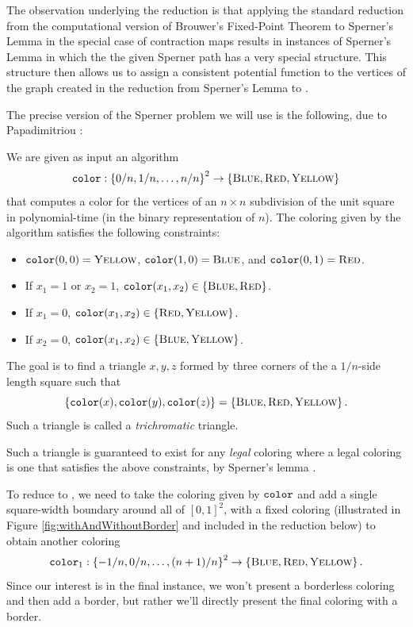 The observation underlying the reduction is that applying the standard reduction from the computational version of Brouwer's Fixed-Point Theorem to Sperner's Lemma in the special case of contraction maps results in instances of Sperner's Lemma in which the the given Sperner path has a very special structure. This structure then allows us to assign a consistent potential function to the vertices of the \PPAD graph created in the reduction from Sperner's Lemma to \EOL.

The precise version of the Sperner problem we will use is the following, due to Papadimitriou \cite{papadimitriou1994complexity}:
\begin{definition}[\Sperner] 
  \label{def:Sperner}
  We are given as input an algorithm
  \[\operatorname{\texttt{color}}: \left\{ 0/n,1/n,\dotsc,n/n \right\}^2 \to \left\{ \textsc{Blue}, \textsc{Red}, \textsc{Yellow} \right\}\] that computes a color for the vertices of an $n\times n$ subdivision of the unit square in polynomial-time (in the binary representation of $n$). The coloring given by the algorithm satisfies the following constraints:
  \begin{itemize}
  \item $\operatorname{\texttt{color}}(0, 0) = \textsc{Yellow}$, $\operatorname{\texttt{color}}(1, 0) = \textsc{Blue}$, and $\operatorname{\texttt{color}}(0, 1) = \textsc{Red}$.
  \item If $x_1 = 1$ or $x_2 = 1$, $\operatorname{\texttt{color}}(x_1,x_2) \in \left\{ \textsc{Blue}, \textsc{Red} \right\}$.
  \item If $x_1 = 0$, $\operatorname{\texttt{color}}(x_1,x_2) \in \left\{ \textsc{Red}, \textsc{Yellow} \right\}$.
  \item If $x_2 = 0$, $\operatorname{\texttt{color}}(x_1,x_2) \in \left\{ \textsc{Blue}, \textsc{Yellow} \right\}$.
  \end{itemize}

  The goal is to find a triangle $x,y,z$ formed by three corners of the a $1/n$-side length square such that \[\left\{ \operatorname{\texttt{color}}(x),\operatorname{\texttt{color}}(y),\operatorname{\texttt{color}}(z) \right\} = \left\{ \textsc{Blue},\textsc{Red},\textsc{Yellow} \right\}\text{.}\] Such a triangle is called a \emph{trichromatic} triangle.
\end{definition}

Such a triangle is guaranteed to exist for any \emph{legal} coloring where a legal coloring is one that satisfies the above constraints, by Sperner's lemma \cite{papadimitriou1994complexity}.

To reduce \Sperner to \EOL, we need to take the coloring given by $\operatorname{\texttt{color}}$ and add a single square-width boundary around all of $[0,1]^2$, with a fixed coloring (illustrated in Figure \ref{fig:withAndWithoutBorder} and included in the reduction below) to obtain another coloring \[\operatorname{\texttt{color}}_1 : \left\{ -1/n,0/n,\dotsc,(n+1)/n \right\}^2 \to \left\{ \textsc{Blue}, \textsc{Red}, \textsc{Yellow} \right\}\text{.}\]  Since our interest is in the final \EOPL instance, we won't present a borderless coloring and then add a border, but rather we'll directly present the final coloring with a border.

